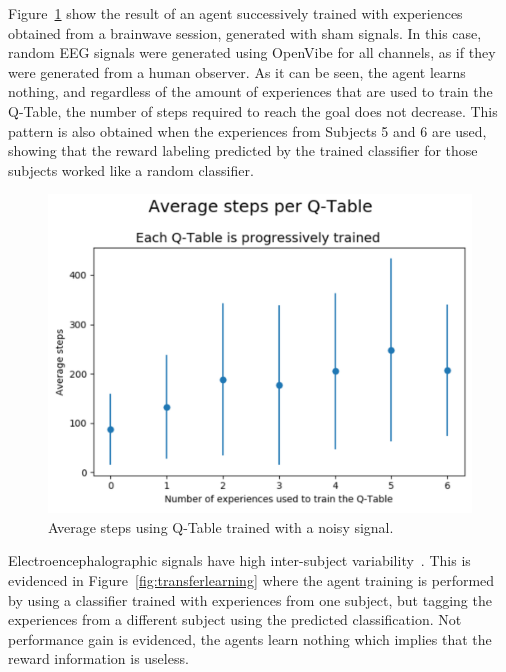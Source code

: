 \documentclass[journal]{IEEEtran}
\begin{document}
{{%

Figure~\ref{fig:avg_steps_noise} show the result of an agent successively trained with experiences obtained from a brainwave session, generated with sham signals.  In this case, random EEG signals were generated using OpenVibe for all channels, as if they were generated from a human observer.  As it can be seen, the agent learns nothing, and regardless of the amount of experiences that are used to train the Q-Table, the number of steps required to reach the goal does not decrease.  This pattern is also obtained when the experiences from Subjects 5 and 6 are used, showing that the reward labeling predicted by the trained classifier for those subjects worked like a random classifier.

\begin{figure}[h!]
\centering
\includegraphics[scale=0.4]{Images/Average_steps/noise.png}
\caption{Average steps using Q-Table trained with a noisy signal.}
\label{fig:avg_steps_noise}
\end{figure}

Electroencephalographic signals have high inter-subject variability~\cite{Chavarriaga2014}.  This is evidenced in Figure~\ref{fig:transferlearning} where the agent training is performed by using a classifier trained with experiences from one subject,  but tagging the experiences from a different subject using the predicted classification.  Not performance gain is evidenced, the agents learn nothing which implies that the reward information is useless.

}}
\end{document}
